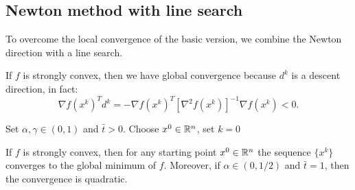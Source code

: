 \subsection{Newton method with line search}

To overcome the local convergence of the basic version, we combine the Newton direction with a line search.

If $f$ is strongly convex, then we have global convergence because $d^k$ is a descent direction, in fact:
\[
    \nabla f(x^k)^T d^k = -\nabla f(x^k)^T\left[\nabla^2 f(x^k)\right]^{-1}\nabla f(x^k) < 0.
\]

\begin{algorithm}[htbp]
\caption{Newton method with (inexact) line search}
Set $\alpha, \gamma \in (0,1)$ and $\bar{t} > 0$. Choose $x^0 \in \mathbb{R}^n$, set $k = 0$\;
\end{algorithm}

\begin{theorem}[Convergence]
    If $f$ is strongly convex, then for any starting point $x^0 \in \mathbb{R}^n$ the sequence $\{x^k\}$ converges to the global minimum of $f$. Moreover, if $\alpha \in (0, 1/2)$ and $\bar{t} = 1$, then the convergence is quadratic.
\end{theorem}
